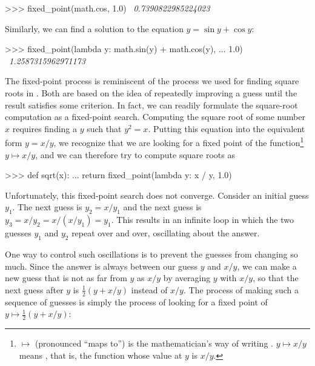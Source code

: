 \begin{codeBlock}
>>> fixed_point(math.cos, 1.0)
~\textit{0.7390822985224023}~
\end{codeBlock}

\noindent
Similarly, we can find a solution to the equation
\( y = \sin y + \cos y \):

\begin{codeBlock}
>>> fixed_point(lambda y: math.sin(y) + math.cos(y),
...             1.0)
~\textit{1.2587315962971173}~
\end{codeBlock}

\noindent
The fixed-point process is reminiscent of the process we used for finding
square roots in .  Both are based on the idea of repeatedly
improving a guess until the result satisfies some criterion.  In fact, we can
readily formulate the square-root computation as a fixed-point search.
Computing the square root of some number \( x \) requires finding a \( y \) such
that \( y^2 = x \).  Putting this equation into the equivalent form
\( y = x / y \), we recognize that we are looking for a fixed point of the
function\footnote{\( \mapsto \) (pronounced ``maps to'') is the mathematician's way of
writing .  \( y \mapsto x / y \) means ,
that is, the function whose value at \( y \) is \( x / y \).} \( y \mapsto x / y \),
and we can therefore try to compute square roots as

\begin{codeBlock}
>>> def sqrt(x):
...     return fixed_point(lambda y: x / y, 1.0)
\end{codeBlock}

\noindent
Unfortunately, this fixed-point search does not converge.  Consider an initial
guess \( y_1 \).  The next guess is \( y_2 = x / y_1 \) and the next guess is
\( y_3 = x / y_2 = x / (x / y_1) = y_1 \).  This results in an
infinite loop in which the two guesses \( y_1 \) and \( y_2 \) repeat over and
over, oscillating about the answer.

One way to control such oscillations is to prevent the guesses from changing so
much.  Since the answer is always between our guess \( y \) and \( x / y \), we
can make a new guess that is not as far from \( y \) as \( x / y \) by averaging
\( y \) with \( x / y \), so that the next guess after \( y \) is
\( \frac{1}{2}(y + x / y) \)
instead of \( x / y \).  The process of making such a sequence of
guesses is simply the process of looking for a fixed point of
\( y \mapsto \frac{1}{2}(y + x / y) \):

